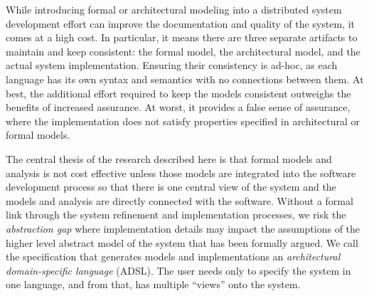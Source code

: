 While introducing formal or architectural modeling into a distributed system
development effort can improve the documentation and quality of the system, it
comes at a high cost. In particular, it means there are three separate artifacts
to maintain and keep consistent: the formal model, the architectural model, and
the actual system implementation. Ensuring their consistency is ad-hoc, as each
language has its own syntax and semantics with no connections between them. At
best, the additional effort required to keep the models consistent outweighs the
benefits of increased assurance. At worst, it provides a false sense of
assurance, where the implementation does not satisfy properties specified in
architectural or formal models.

The central thesis of the research described here is that formal models and
analysis is not cost effective unless those models are integrated into the
software development process so that there is one central view of the system and
the models and analysis are directly connected with the software. Without a
formal link through the system refinement and implementation processes, we risk
the \emph{abstraction gap} where implementation details may impact the
assumptions of the higher level abstract model of the system that has been
formally argued. We call the specification that generates models and
implementations an \emph{architectural domain-specific language} (ADSL). The
user needs only to specify the system in one language, and from that, has
multiple ``views'' onto the system.



